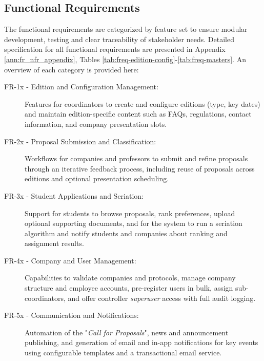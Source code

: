     \subsection{Functional Requirements}
        {
            The functional requirements are categorized by feature set to ensure modular development, 
            testing and clear traceability of stakeholder needs. Detailed specification for all functional requirements are presented in Appendix \ref{ann:fr_nfr_appendix}, Tables \ref{tab:freq-edition-config}-\ref{tab:freq-masters}. 
            An overview of each category is provided here:
        }

        \begin{description}
            \item[FR-1x - Edition and Configuration Management:] 
                {
                    Features for coordinators to create and configure editions (type, key dates) and maintain edition-specific content such as FAQs,
                    regulations, contact information, and company presentation slots.
                }
            \item[FR-2x - Proposal Submission and Classification:] 
                {
                    Workflows for companies and professors to submit and refine proposals through an iterative feedback process, including reuse
                    of proposals across editions and optional presentation scheduling.
                }
            \item[FR-3x - Student Applications and Seriation:] 
                {
                    Support for students to browse proposals, rank preferences, upload optional supporting documents, and for the system to run a seriation
                    algorithm and notify students and companies about ranking and assignment results.
                }
            \item[FR-4x - Company and User Management:] 
                {
                    Capabilities to validate companies and protocols, manage company structure and employee accounts, pre-register users in bulk, assign
                    sub-coordinators, and offer controller \textit{superuser} access with full audit logging.
                }
            \item[FR-5x - Communication and Notifications:] 
                {
                    Automation of the "\textit{Call for Proposals}", news and announcement publishing, and generation of email and in-app notifications for key events
                    using configurable templates and a transactional email service.
}
\end{description}

